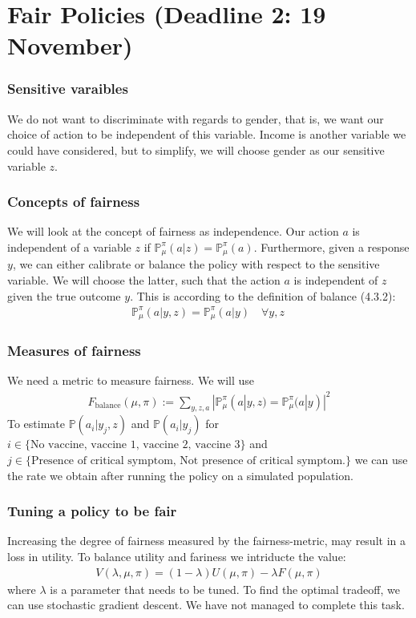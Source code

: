 
\section*{Fair Policies (Deadline 2: 19 November)}

\subsubsection*{Sensitive varaibles}
We do not want to discriminate with regards to gender, that is, we want our choice of action to be independent of this variable. 
Income is another variable we could have considered, but to simplify, we will choose gender as our sensitive variable $z$. 


\subsubsection*{Concepts of fairness}
We will look at the concept of fairness as independence. 
Our action $a$ is independent of a variable $z$ if $\mathbb{P}_{\mu}^{\pi}(a|z) = \mathbb{P}_{\mu}^{\pi}(a)$. 
Furthermore, given a response $y$, we can either calibrate or balance the policy with respect to the sensitive variable.  
We will choose the latter, such that the action $a$ is independent of $z$ given the true outcome $y$. 
This is according to the definition of balance (4.3.2):
\begin{align*}
    \mathbb{P}_{\mu}^{\pi}(a|y,z) = \mathbb{P}_{\mu}^{\pi}(a|y) \quad \forall y,z\
\end{align*}
 
\subsubsection*{Measures of fairness}
We need a metric to measure fairness. We will use
\begin{align*}
    F_{\text{balance}}(\mu, \pi) := \sum_{y,z,a}| \mathbb{P}_{\mu}^{\pi}(a|y,z) = \mathbb{P}_{\mu}^{\pi}(a|y)|^2
\end{align*}
To estimate $\mathbb{P}(a_i|y_j,z)$ and $\mathbb{P}(a_i|y_j)$ for $i \in \{\text{No vaccine, vaccine 1, vaccine 2, vaccine 3}\}$ and $j \in \{\text{Presence of critical symptom, Not presence of critical symptom}.\}$ we can use the rate we obtain after running the policy on a simulated population. 
    
\subsubsection*{Tuning a policy to be fair}
Increasing the degree of fairness measured by the fairness-metric, may result in a loss in utility. 
To balance utility and fariness we intriducte the value: 
\begin{align*}
    V(\lambda, \mu, \pi) = (1-\lambda)U(\mu, \pi) - \lambda F(\mu, \pi)
\end{align*}
where $\lambda$ is a parameter that needs to be tuned. 
To find the optimal tradeoff, we can use stochastic gradient descent. 
We have not managed to complete this task. 

